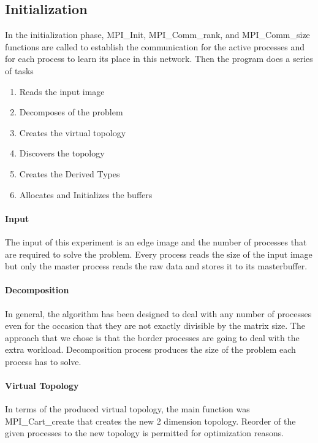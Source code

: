 \documentclass[12pt,a4paper]{article}
\begin{document}
    \subsection{Initialization}
	  In the initialization phase, MPI\_Init, MPI\_Comm\_rank, and MPI\_Comm\_size functions are called to establish the communication for the active processes and for each process to learn its place in this network. Then the program does a series of tasks
		 
      \begin{enumerate}
        \item Reads the input image
        \item Decomposes of the problem
        \item Creates the virtual topology
        \item Discovers the topology
        \item Creates the Derived Types
        \item Allocates and Initializes the buffers
      \end{enumerate}

      \paragraph{Input}
			   The input of this experiment is an edge image and the number of processes that are required to solve the problem. Every process reads the size of the input image but only the master process reads the raw data and stores it to its masterbuffer.

      \paragraph{Decomposition}
        In general, the algorithm has been designed to deal with any number of processes even for the occasion that they are not exactly divisible by the matrix size. The approach that we chose is that the border processes are going to deal with the extra workload. Decomposition process produces the size of the problem each process has to solve.

      \paragraph{Virtual Topology}
        In terms of the produced virtual topology, the main function was MPI\_Cart\_create that creates the new 2 dimension topology. Reorder of the given processes to the new topology is permitted for optimization reasons.
\end{document}
